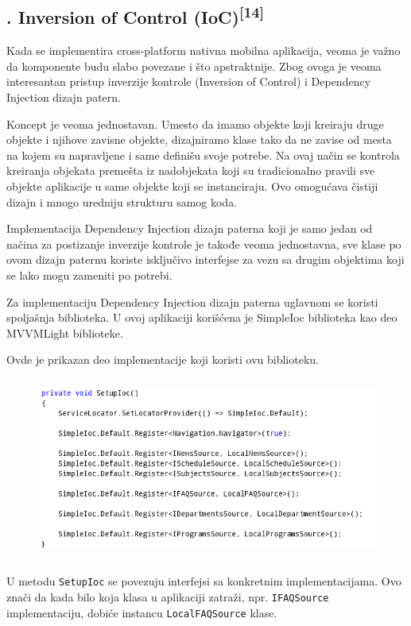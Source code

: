 \documentclass[a4paper]{article}
\begin{document}
\subsection[7.4. Inversion of Control (IoC)[14{]}]{.
Inversion of Control (IoC)\textsuperscript{[14]}}
\hypertarget{RefHeadingToc852882405265}{}Kada se implementira
cross-platform nativna mobilna aplikacija, veoma je važno da komponente
budu slabo povezane i što apstraktnije. Zbog ovoga je veoma
interesantan pristup inverzije kontrole (Inversion of Control) i
Dependency Injection dizajn patern.

Koncept je veoma jednostavan. Umesto da imamo objekte koji kreiraju
druge objekte i njihove zavisne objekte, dizajniramo klase tako da ne
zavise od mesta na kojem su napravljene i same definišu svoje potrebe.
Na ovaj način se kontrola kreiranja objekata premešta iz nadobjekata
koji su tradicionalno pravili sve objekte aplikacije u same objekte
koji se instanciraju. Ovo omogućava čistiji dizajn i mnogo uredniju
strukturu samog koda.

Implementacija Dependency Injection dizajn paterna koji je samo jedan od
načina za postizanje inverzije kontrole je takođe veoma jednostavna,
sve klase po ovom dizajn paternu koriste isključivo interfejse za vezu
sa drugim objektima koji se lako mogu zameniti po potrebi.

Za implementaciju Dependency Injection dizajn paterna uglavnom se
koristi spoljašnja biblioteka. U ovoj aplikaciji korišćena je SimpleIoc
biblioteka kao deo MVVMLight biblioteke.

Ovde je prikazan deo implementacije koji koristi ovu biblioteku.



\begin{figure}
\centering
\includegraphics[width=124.97mm,height=60.03mm]{msc-img40.png}
\end{figure}
U metodu \texttt{\textcolor[rgb]{0.0,0.4,0.8}{SetupIoc}} se povezuju
interfejsi sa konkretnim implementacijama. Ovo znači da kada bilo koja
klasa u aplikaciji zatraži, npr.
\texttt{\textcolor[rgb]{0.0,0.4,0.8}{IFAQSource}} implementaciju,
dobiće instancu \texttt{\textcolor[rgb]{0.0,0.4,0.8}{LocalFAQSource}}
klase.
\end{document}

